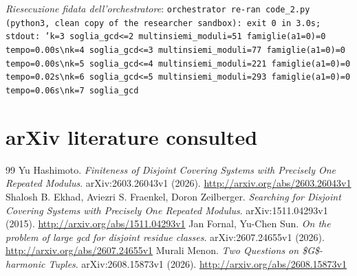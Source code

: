 \documentclass[11pt,a4paper]{article}
\begin{document}
\noindent\emph{Riesecuzione fidata dell'orchestratore}: \texttt{orchestrator re-ran code\_2.py (python3, clean copy of the researcher sandbox): exit 0 in 3.0s; stdout: 'k=3 soglia\_gcd\textless{}=2 multinsiemi\_moduli=51 famiglie(a1=0)=0 tempo=0.00s\textbackslash{}nk=4 soglia\_gcd\textless{}=3 multinsiemi\_moduli=77 famiglie(a1=0)=0 tempo=0.00s\textbackslash{}nk=5 soglia\_gcd\textless{}=4 multinsiemi\_moduli=221 famiglie(a1=0)=0 tempo=0.02s\textbackslash{}nk=6 soglia\_gcd\textless{}=5 multinsiemi\_moduli=293 famiglie(a1=0)=0 tempo=0.06s\textbackslash{}nk=7 soglia\_gcd}

\section{arXiv literature consulted}
\begin{thebibliography}{99}
 Yu Hashimoto. \emph{Finiteness of Disjoint Covering Systems with Precisely One Repeated Modulus}. arXiv:2603.26043v1 (2026). \url{http://arxiv.org/abs/2603.26043v1}
 Shalosh B. Ekhad, Aviezri S. Fraenkel, Doron Zeilberger. \emph{Searching for Disjoint Covering Systems with Precisely One Repeated Modulus}. arXiv:1511.04293v1 (2015). \url{http://arxiv.org/abs/1511.04293v1}
 Jan Fornal, Yu-Chen Sun. \emph{On the problem of large gcd for disjoint residue classes}. arXiv:2607.24655v1 (2026). \url{http://arxiv.org/abs/2607.24655v1}
 Murali Menon. \emph{Two Questions on \$G\$-harmonic Tuples}. arXiv:2608.15873v1 (2026). \url{http://arxiv.org/abs/2608.15873v1}
\end{thebibliography}
\end{document}

